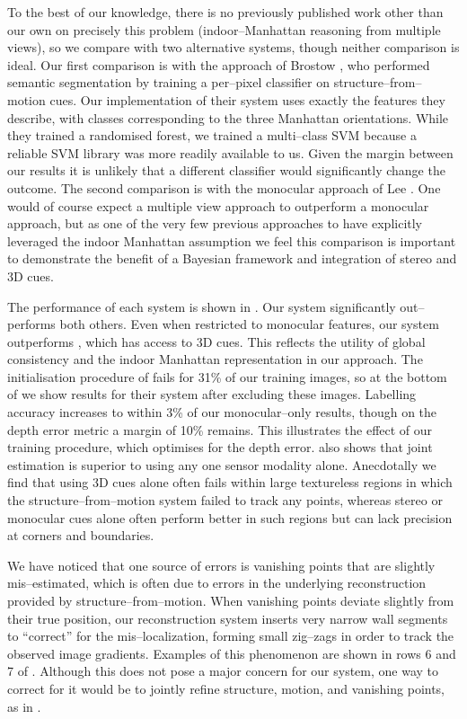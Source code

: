 To the best of our knowledge, there is no previously published work
other than our own on precisely this problem (indoor--Manhattan
reasoning from multiple views), so we compare with two alternative
systems, though neither comparison is ideal. Our first comparison is
with the approach of Brostow \etal \cite{Brostow08}, who performed
semantic segmentation by training a per--pixel classifier on
structure--from--motion cues. Our implementation of their system uses
exactly the features they describe, with classes corresponding to the
three Manhattan orientations. While they trained a randomised forest,
we trained a multi--class SVM because a reliable SVM library was more
readily available to us. Given the margin between our results it is
unlikely that a different classifier would significantly change the
outcome. The second comparison is with the monocular approach of Lee
\etal \cite{Lee09}. One would of course expect a multiple view
approach to outperform a monocular approach, but as one of the very
few previous approaches to have explicitly leveraged the indoor
Manhattan assumption we feel this comparison is important to
demonstrate the benefit of a Bayesian framework and integration of
stereo and 3D cues.

The performance of each system is shown in . Our
system significantly out--performs both others. Even when restricted
to monocular features, our system outperforms \cite{Brostow08}, which
has access to 3D cues. This reflects the utility of global consistency
and the indoor Manhattan representation in our approach. The
initialisation procedure of \cite{Lee09} fails for 31\% of our
training images, so at the bottom of  we show
results for their system after excluding these images. Labelling
accuracy increases to within 3\% of our monocular--only results,
though on the depth error metric a margin of 10\% remains. This
illustrates the effect of our training procedure, which optimises for
the depth error.  also shows that joint estimation
is superior to using any one sensor modality alone. Anecdotally we
find that using 3D cues alone often fails within large textureless
regions in which the structure--from--motion system failed to track
any points, whereas stereo or monocular cues alone often perform
better in such regions but can lack precision at corners and
boundaries.

We have noticed that one source of errors is vanishing points that are
slightly mis--estimated, which is often due to errors in the
underlying reconstruction provided by structure--from--motion. When
vanishing points deviate slightly from their true position, our
reconstruction system inserts very narrow wall segments to ``correct''
for the mis--localization, forming small zig--zags in order to track
the observed image gradients. Examples of this phenomenon are shown in
rows 6 and 7 of . Although this does not pose a
major concern for our system, one way to correct for it would be to
jointly refine structure, motion, and vanishing points, as in
\cite{Sinha2008}.

